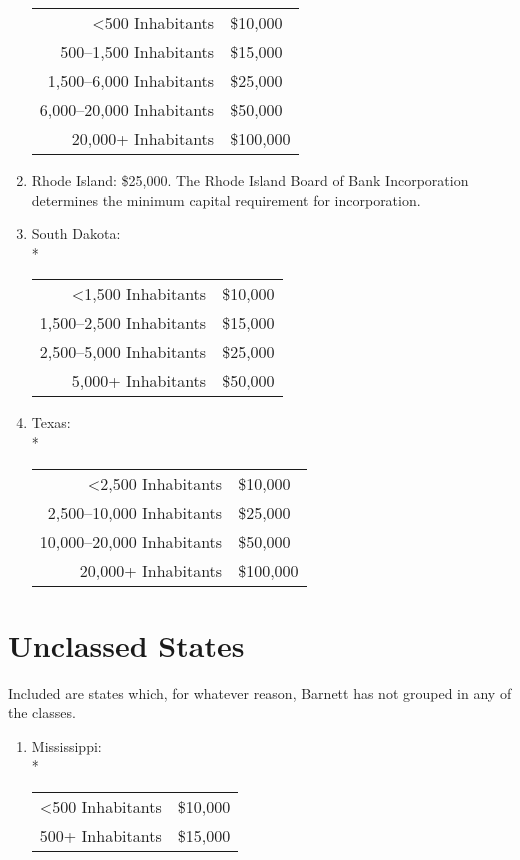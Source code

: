 ﻿\documentclass[12pt]{report}
\begin{document}
\begin{enumerate}
            \begin{tabular}{r|l}
                <500 Inhabitants & \$10,000\\
                500--1,500 Inhabitants & \$15,000\\
                1,500--6,000 Inhabitants & \$25,000\\
                6,000--20,000 Inhabitants & \$50,000\\
                20,000+ Inhabitants & \$100,000
            \end{tabular}
        \item Rhode Island: \$25,000. The Rhode Island Board of Bank Incorporation determines the minimum capital requirement for incorporation.
        \item South Dakota:\\*
            \begin{tabular}{r|l}
                <1,500 Inhabitants & \$10,000\\
                1,500--2,500 Inhabitants & \$15,000\\
                2,500--5,000 Inhabitants & \$25,000\\
                5,000+ Inhabitants & \$50,000
            \end{tabular}
        \item Texas:\\*
            \begin{tabular}{r|l}
                <2,500 Inhabitants & \$10,000\\
                2,500--10,000 Inhabitants & \$25,000\\
                10,000--20,000 Inhabitants & \$50,000\\
                20,000+ Inhabitants & \$100,000
            \end{tabular}
    \end{enumerate}
    
\section{Unclassed States}
Included are states which, for whatever reason, Barnett has not grouped in any of the classes.

    \begin{enumerate}
        \item Mississippi:\\*
            \begin{tabular}{r|l}
                <500 Inhabitants & \$10,000\\
                500+ Inhabitants & \$15,000
            \end{tabular}
    \end{enumerate}
\end{document}
